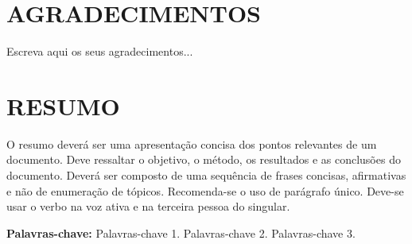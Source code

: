 \documentclass[12pt, a4paper]{report}
\theoremstyle{remark}
\theoremstyle{definition}
\theoremstyle{definition}
\theoremstyle{plain}
\theoremstyle{plain}
\theoremstyle{plain}
\theoremstyle{definition}
\begin{document}
\thispagestyle{empty}
\null
\vfill
\begin{flushright}
\parbox{4cm}{
}
\end{flushright}
\thispagestyle{empty}
\newpage


\thispagestyle{empty}
\section*{\normalsize \centering \textbf{AGRADECIMENTOS}}

Escreva aqui os seus agradecimentos...

\newpage


\thispagestyle{empty}
\null
\vfill
\begin{flushright}
\parbox{8cm}{
}
\end{flushright}
\newpage


\thispagestyle{empty}
\section*{\normalsize \centering \textbf{RESUMO}}

\noindent  O resumo deverá ser uma apresentação concisa dos pontos relevantes de um documento. Deve ressaltar o objetivo, o método, os resultados e as conclusões do documento. Deverá ser composto de uma sequência de frases concisas, afirmativas e não de enumeração de tópicos. Recomenda-se o uso de parágrafo único. Deve-se usar o verbo na voz ativa e na terceira pessoa do singular.

\vspace*{0.5cm}

\noindent\textbf{Palavras-chave:} Palavras-chave 1. Palavras-chave 2. Palavras-chave 3.
 \newpage

\end{document}
